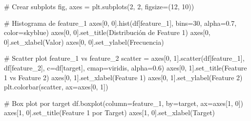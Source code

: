 \documentclass[
]{article}
\newenvironment{Shaded}{\begin{snugshade}}{\end{snugshade}}
\newcommand{\CommentTok}[1]{\textcolor[rgb]{0.37,0.37,0.37}{#1}}
\newcommand{\DecValTok}[1]{\textcolor[rgb]{0.68,0.00,0.00}{#1}}
\newcommand{\FloatTok}[1]{\textcolor[rgb]{0.68,0.00,0.00}{#1}}
\newcommand{\NormalTok}[1]{\textcolor[rgb]{0.00,0.23,0.31}{#1}}
\newcommand{\OperatorTok}[1]{\textcolor[rgb]{0.37,0.37,0.37}{#1}}
\newcommand{\StringTok}[1]{\textcolor[rgb]{0.13,0.47,0.30}{#1}}
\begin{document}
\begin{Shaded}
\begin{Highlighting}[]
\CommentTok{\# Crear subplots}
\NormalTok{fig, axes }\OperatorTok{=}\NormalTok{ plt.subplots(}\DecValTok{2}\NormalTok{, }\DecValTok{2}\NormalTok{, figsize}\OperatorTok{=}\NormalTok{(}\DecValTok{12}\NormalTok{, }\DecValTok{10}\NormalTok{))}

\CommentTok{\# Histograma de feature\_1}
\NormalTok{axes[}\DecValTok{0}\NormalTok{, }\DecValTok{0}\NormalTok{].hist(df[}\StringTok{\textquotesingle{}feature\_1\textquotesingle{}}\NormalTok{], bins}\OperatorTok{=}\DecValTok{30}\NormalTok{, alpha}\OperatorTok{=}\FloatTok{0.7}\NormalTok{, color}\OperatorTok{=}\StringTok{\textquotesingle{}skyblue\textquotesingle{}}\NormalTok{)}
\NormalTok{axes[}\DecValTok{0}\NormalTok{, }\DecValTok{0}\NormalTok{].set\_title(}\StringTok{\textquotesingle{}Distribución de Feature 1\textquotesingle{}}\NormalTok{)}
\NormalTok{axes[}\DecValTok{0}\NormalTok{, }\DecValTok{0}\NormalTok{].set\_xlabel(}\StringTok{\textquotesingle{}Valor\textquotesingle{}}\NormalTok{)}
\NormalTok{axes[}\DecValTok{0}\NormalTok{, }\DecValTok{0}\NormalTok{].set\_ylabel(}\StringTok{\textquotesingle{}Frecuencia\textquotesingle{}}\NormalTok{)}

\CommentTok{\# Scatter plot feature\_1 vs feature\_2}
\NormalTok{scatter }\OperatorTok{=}\NormalTok{ axes[}\DecValTok{0}\NormalTok{, }\DecValTok{1}\NormalTok{].scatter(df[}\StringTok{\textquotesingle{}feature\_1\textquotesingle{}}\NormalTok{], df[}\StringTok{\textquotesingle{}feature\_2\textquotesingle{}}\NormalTok{], }
\NormalTok{                           c}\OperatorTok{=}\NormalTok{df[}\StringTok{\textquotesingle{}target\textquotesingle{}}\NormalTok{], cmap}\OperatorTok{=}\StringTok{\textquotesingle{}viridis\textquotesingle{}}\NormalTok{, alpha}\OperatorTok{=}\FloatTok{0.6}\NormalTok{)}
\NormalTok{axes[}\DecValTok{0}\NormalTok{, }\DecValTok{1}\NormalTok{].set\_title(}\StringTok{\textquotesingle{}Feature 1 vs Feature 2\textquotesingle{}}\NormalTok{)}
\NormalTok{axes[}\DecValTok{0}\NormalTok{, }\DecValTok{1}\NormalTok{].set\_xlabel(}\StringTok{\textquotesingle{}Feature 1\textquotesingle{}}\NormalTok{)}
\NormalTok{axes[}\DecValTok{0}\NormalTok{, }\DecValTok{1}\NormalTok{].set\_ylabel(}\StringTok{\textquotesingle{}Feature 2\textquotesingle{}}\NormalTok{)}
\NormalTok{plt.colorbar(scatter, ax}\OperatorTok{=}\NormalTok{axes[}\DecValTok{0}\NormalTok{, }\DecValTok{1}\NormalTok{])}

\CommentTok{\# Box plot por target}
\NormalTok{df.boxplot(column}\OperatorTok{=}\StringTok{\textquotesingle{}feature\_1\textquotesingle{}}\NormalTok{, by}\OperatorTok{=}\StringTok{\textquotesingle{}target\textquotesingle{}}\NormalTok{, ax}\OperatorTok{=}\NormalTok{axes[}\DecValTok{1}\NormalTok{, }\DecValTok{0}\NormalTok{])}
\NormalTok{axes[}\DecValTok{1}\NormalTok{, }\DecValTok{0}\NormalTok{].set\_title(}\StringTok{\textquotesingle{}Feature 1 por Target\textquotesingle{}}\NormalTok{)}
\NormalTok{axes[}\DecValTok{1}\NormalTok{, }\DecValTok{0}\NormalTok{].set\_xlabel(}\StringTok{\textquotesingle{}Target\textquotesingle{}}\NormalTok{)}


\end{Highlighting}
\end{Shaded}
\end{document}
